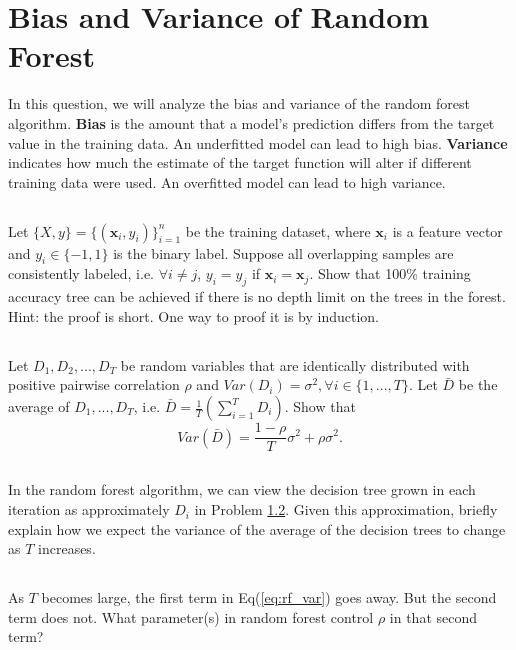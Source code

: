 \documentclass{exam}
\begin{document}
\section{Bias and Variance of Random Forest}
In this question, we will analyze the bias and variance of the random forest algorithm. \textbf{Bias} is the amount that a model’s prediction differs from the target value in the training data.
An underfitted model can lead to high bias. \textbf{Variance} indicates how much the estimate of the target function will alter if different training data were used. An overfitted model can lead to high variance. 

\subsection{}
Let $\{X, y\} = \{(\bm{x}_i, y_i)\}_{i=1}^n$ be the training dataset, where $\bm{x}_i$ is a feature vector and $y_i \in \{-1, 1\}$ is the binary label. Suppose all overlapping samples are consistently labeled, i.e. $\forall i \neq j$, $y_i = y_j$ if $\bm{x}_i = \bm{x}_j$. Show that 100\% training accuracy tree can be achieved if there is no depth limit on the trees in the forest. 
Hint: the proof is short. One way to proof it is by induction. 

\subsection{}\label{tree_rv}
Let $D_1, D_2, ..., D_T$ be random variables that are identically distributed with positive pairwise correlation $\rho$ and $Var(D_i) = \sigma^2, \forall i \in \{1,...,T\}$. Let $\bar{D}$ be the average of $D_1, ..., D_T$, i.e. $\bar{D} = \frac{1}{T}(\sum_{i=1}^T D_i)$. Show that 
\begin{equation}\label{eq:rf_var}
    Var(\bar{D}) = \frac{1-\rho}{T}\sigma^2 + \rho \sigma^2. 
\end{equation}

\subsection{}
In the random forest algorithm, we can view the decision tree grown in each iteration as approximately $D_i$ in Problem \ref{tree_rv}. Given this approximation, briefly explain how we expect the variance of the average of the decision trees to change as $T$ increases. 

\subsection{}
As $T$ becomes large, the first term in Eq(\ref{eq:rf_var}) goes away. But the second term does not. What parameter(s) in random forest control $\rho$ in that second term?
\end{document}
